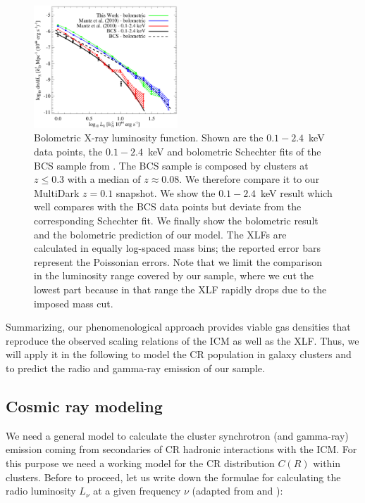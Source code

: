 \documentclass[traditabstract]{aa}
\begin{document}
\begin{figure}[t]
\centering
\includegraphics[width=0.48\textwidth]{figures/xlf.eps}
\caption{Bolometric X-ray luminosity function. Shown are the $0.1-2.4$~keV data
  points, the $0.1-2.4$~keV and bolometric Schechter fits of the BCS sample from
  \cite{1997ApJ...479L.101E}. The BCS sample is composed by clusters at
  $z\leq0.3$ with a median of $z \approx 0.08$. We therefore compare it to our
  MultiDark $z=0.1$ snapshot. We show the \cite{2010MNRAS.406.1773M}
  $0.1-2.4$~keV result which well compares with the BCS data points but deviate
  from the corresponding Schechter fit. We finally show the
  \cite{2010MNRAS.406.1773M} bolometric result and the bolometric prediction of
  our model. The XLFs are calculated in equally log-spaced mass bins; the
  reported error bars represent the Poissonian errors. Note that we limit the
  comparison in the luminosity range covered by our sample, where we cut the
  lowest part because in that range the XLF rapidly drops due to the imposed
  mass cut.  }
\label{fig:XLF}
\end{figure}

Summarizing, our phenomenological approach provides viable gas densities that
reproduce the observed scaling relations of the ICM as well as the XLF. Thus, we
will apply it in the following to model the CR population in galaxy clusters and
to predict the radio and gamma-ray emission of our sample.


\subsection{Cosmic ray modeling}
\label{sec:2.3}
We need a general model to calculate the cluster synchrotron (and gamma-ray) emission coming from secondaries of CR hadronic interactions with the ICM. For this purpose we need a working model for the CR distribution $C(R)$ within clusters. Before to proceed, let us write down the formulae for calculating the radio luminosity $L_{\nu}$ at a given frequency $\nu$ (adapted from \citealp{2008MNRAS.385.1211P} and \citealp{2011A&A...527A..99E}):
\end{document}
